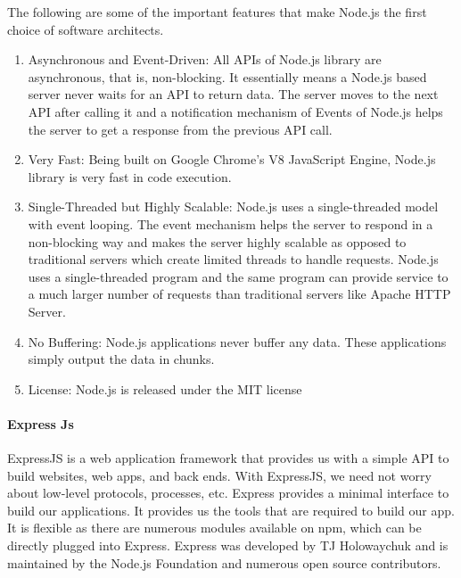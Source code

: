 The following are some of the important features that make Node.js the first choice of software architects.
\begin{enumerate}
      \item
            Asynchronous and Event-Driven: All APIs of Node.js library are asynchronous, that is, non-blocking. It essentially means a Node.js based server never waits for an API to return data. The server moves to the next API after calling it and a notification mechanism of Events of Node.js helps the server to get a response from the previous API call.
      \item
            Very Fast: Being built on Google Chrome's V8 JavaScript Engine, Node.js library is very fast in code execution.
      \item
            Single-Threaded but Highly Scalable: Node.js uses a single-threaded model with event looping. The event mechanism helps the server to respond in a non-blocking way and makes the server highly scalable as opposed to traditional servers which create limited threads to handle requests. Node.js uses a single-threaded program and the same program can provide service to a much larger number of requests than traditional servers like Apache HTTP Server.
      \item
            No Buffering: Node.js applications never buffer any data. These applications simply output the data in chunks.
      \item
            License: Node.js is released under the MIT license
\end{enumerate}



\paragraph{Express Js}
ExpressJS is a web application framework that provides us with a simple API to build websites, web apps, and back ends. With ExpressJS, we need not worry about low-level protocols, processes, etc.
Express provides a minimal interface to build our applications. It provides us the tools that are required to build our app. It is flexible as there are numerous modules available on npm, which can be directly plugged into Express.
Express was developed by TJ Holowaychuk and is maintained by the Node.js Foundation and numerous open source contributors.



